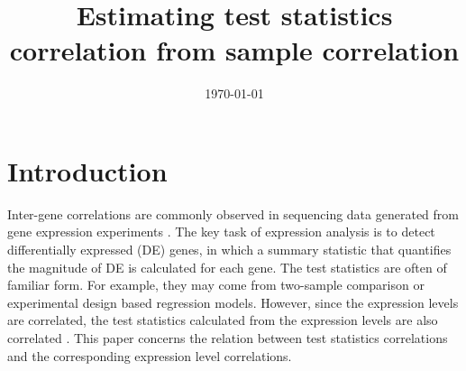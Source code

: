\documentclass[12pt, a4paper]{article}
\title{Estimating test statistics correlation from sample correlation}
\date{\today} %
\begin{document}
	\maketitle
	\section{Introduction}
%	
%
%	

	Inter-gene correlations are commonly observed in sequencing data generated from gene expression 
	experiments \citep{efron2012large, qiu2005effects,storey2003positive, huang2013gene, 
	gatti2010heading}.
	The key task of expression analysis is to detect differentially expressed (DE) genes, in which 
	a summary statistic that quantifies the magnitude of DE is calculated for each gene. The test 
	statistics are often of familiar form. For example, 
	they may come from two-sample comparison or experimental design based regression models. 
	However, since the expression levels are correlated, the test statistics calculated from the 
	expression levels are also correlated \citep{barry2008statistical, efron2007correlation, 
	wu2012camera}. This paper concerns the relation between test 
	statistics correlations and the corresponding expression level correlations.
\end{document}
